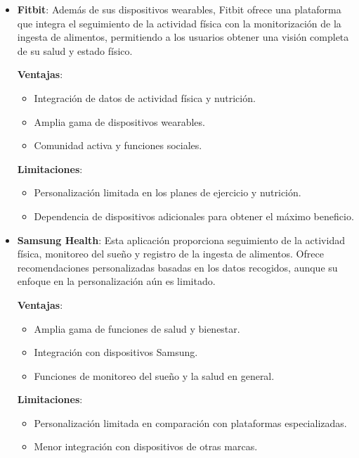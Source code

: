 \begin{itemize}
  \item \textbf{Fitbit}: Además de sus dispositivos wearables, Fitbit ofrece una plataforma que integra el seguimiento de la actividad física con la monitorización de la ingesta de alimentos, permitiendo a los usuarios obtener una visión completa de su salud y estado físico.

    \textbf{Ventajas}:
    \begin{itemize}
      \item Integración de datos de actividad física y nutrición.
      \item Amplia gama de dispositivos wearables.
      \item Comunidad activa y funciones sociales.
    \end{itemize}

    \textbf{Limitaciones}:
    \begin{itemize}
      \item Personalización limitada en los planes de ejercicio y nutrición.
      \item Dependencia de dispositivos adicionales para obtener el máximo beneficio.
    \end{itemize}
  
  \item \textbf{Samsung Health}: Esta aplicación proporciona seguimiento de la actividad física, monitoreo del sueño y registro de la ingesta de alimentos. Ofrece recomendaciones personalizadas basadas en los datos recogidos, aunque su enfoque en la personalización aún es limitado.

    \textbf{Ventajas}:
    \begin{itemize}
      \item Amplia gama de funciones de salud y bienestar.
      \item Integración con dispositivos Samsung.
      \item Funciones de monitoreo del sueño y la salud en general.
    \end{itemize}

    \textbf{Limitaciones}:
    \begin{itemize}
      \item Personalización limitada en comparación con plataformas especializadas.
      \item Menor integración con dispositivos de otras marcas.
    \end{itemize}
\end{itemize}


